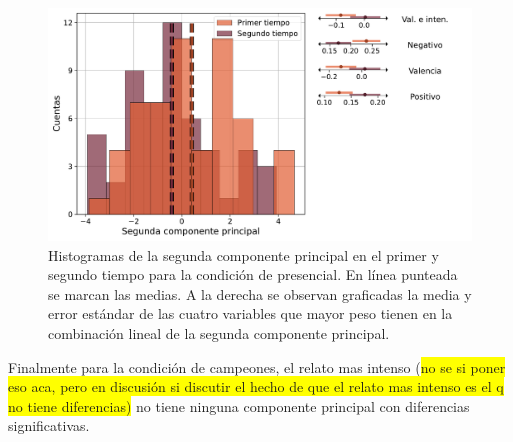 \begin{figure}[h]
    \centering
    \includegraphics[width = 14cm]{figures/ch03/DosTiempos/presencial_PC2.pdf} 
    \caption{Histogramas de la segunda componente principal en el primer y segundo tiempo para la condición de presencial. En línea punteada se marcan las medias. A la derecha se observan graficadas la media y error estándar de las cuatro variables que mayor peso tienen en la combinación lineal de la segunda componente principal.}
\label{fig:cap3_presPC2}
\end{figure}

Finalmente para la condición de campeones, el relato mas intenso (\colorbox{yellow}{no se si poner eso aca, pero en discusión si discutir el hecho de que el relato mas intenso es el q no tiene diferencias)} no tiene ninguna componente principal con diferencias significativas.

